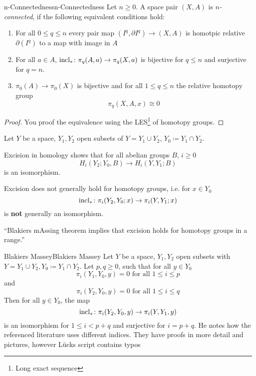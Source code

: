 \documentclass[language=english]{TemplateLecture}
\begin{document}
\begin{defi}{n-Connectedness}{n-Connectedness}
    Let \(n \geq 0\). A space pair \((X,A)\) is \emph{\(n\)-connected}, if the following equivalent conditions hold:
    \begin{enumerate}
        \item For all \(0 \leq q\leq n\) every pair map \((I^q, \partial I^q) \to (X,A)\) is homotpic relative \(\partial(I^q)\) to a map with image in \(A\)
        \item For all \(a \in A\), \(\operatorname{incl}_*\colon \pi_q(A,a) \to \pi_q(X,a)\) is bijective for \(q \leq n\) and surjective for \(q = n\).
        \item \(\pi_0(A) \to \pi_0(X)\) is bijective and for all \(1 \leq q \leq n\) the relative homotopy group
        \[\pi_q(X,A,x) \cong 0\]
    \end{enumerate}
\end{defi}

\begin{proof}
    You proof the equivalence using the LES\footnote{Long exact sequence} of homotopy groups.
\end{proof}


Let \(Y\) be a space, \(Y_1, Y_2\) open subsets of \(Y = Y_1 \cup Y_2\), \(Y_0 \coloneq Y_1\cap Y_2\).

Excision in homology shows that for all abelian groups \(B\), \(i \geq 0\)
\[H_i(Y_2; Y_0, B) \to H_i(Y,Y_1; B)\]
is an isomorphism.

Excision does not generally hold for homotopy groups, i.e. for \(x \in Y_0\)
\[\operatorname{incl}_*\colon \pi_i(Y_2, Y_0; x) \to \pi_i(Y, Y_1; x)\]
is \textbf{not} generally an isomorphism.

\enquote {Blakiers mAssing theorem implies that excision holds for homotopy groups in a range.}

\begin{thm}{Blakiers Massey}{Blakiers Massey}
    Let \(Y\) be a space, \(Y_1, Y_2\) open subsets with \(Y= Y_1 \cup Y_2, Y_0 \coloneq Y_1 \cap Y_2\). Let \(p, q \geq 0\), such that for all \(y \in Y_0\)
    \[\pi_i(Y_1, Y_0, y) = 0 \text{ for all } 1 \leq i \leq p\]
    and
    \[\pi_i(Y_2, Y_0, y) = 0 \text{ for all } 1 \leq i \leq q\]
    Then for all \(y \in Y_0\), the map
    \[\operatorname{incl}_*\colon \pi_i(Y_2, Y_0, y) \to \pi_i(Y, Y_1, y)\]
    is an isomorphism for \(1 \leq i < p+q\) and surjective for \(i = p+q\). He notes how the referenced literature uses different indices. They have proofs in more detail and pictures, however Lücks script contains typos
\end{thm}
\end{document}
